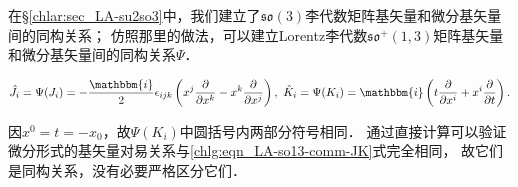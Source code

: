 在\S\ref{chlar:sec_LA-su2so3}中，我们建立了$\mathfrak{so}(3)$李代数矩阵基矢量和微分基矢量间的同构关系；
仿照那里的做法，可以建立Lorentz李代数$\mathfrak{so}^{+}(1,3)$矩阵基矢量和微分基矢量间的同构关系$\Psi$．
\begin{small}
\setlength{\mathindent}{0em}
\begin{equation}\label{chlg:eqn_LA-so13-JK-diff}
    \hat{J}_i=\Psi(J_i)= -\frac{\mathbbm{i}}{2}\epsilon_{ijk} \left(x^j\frac{\partial }{\partial x^k}
    - x^k\frac{\partial }{\partial x^j}\right), \ 
    \hat{K}_i=\Psi(K_i)= \mathbbm{i} \left(t\frac{\partial }{\partial x^i}+  x^i\frac{\partial }{\partial t}\right) .
\end{equation} \setlength{\mathindent}{2em}
\end{small}
因$x^0 = t=-x_0$，故$\Psi(K_i)$中圆括号内两部分符号相同．
通过直接计算可以验证微分形式的基矢量对易关系与\eqref{chlg:eqn_LA-so13-comm-JK}式完全相同，
故它们是同构关系，没有必要严格区分它们．




 

